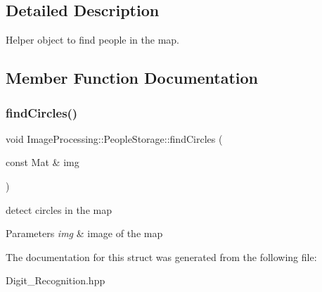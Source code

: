 \subsection{Detailed Description}
Helper object to find people in the map. 

\subsection{Member Function Documentation}
\mbox{\label{struct_image_processing_1_1_people_storage_a015359691478ed0b1f08e09b8dedc520}} 
\subsubsection{\texorpdfstring{find\+Circles()}{findCircles()}}
{\footnotesize\ttfamily void Image\+Processing\+::\+People\+Storage\+::find\+Circles (\begin{DoxyParamCaption}\item[{const Mat \&}]{img }\end{DoxyParamCaption})\hspace{0.3cm}{\ttfamily [inline]}}

detect circles in the map 
\begin{DoxyParams}{Parameters}
{\em img} & image of the map \\
\hline
\end{DoxyParams}


The documentation for this struct was generated from the following file\+:\begin{DoxyCompactItemize}
\item 
Digit\+\_\+\+Recognition.\+hpp\end{DoxyCompactItemize}
